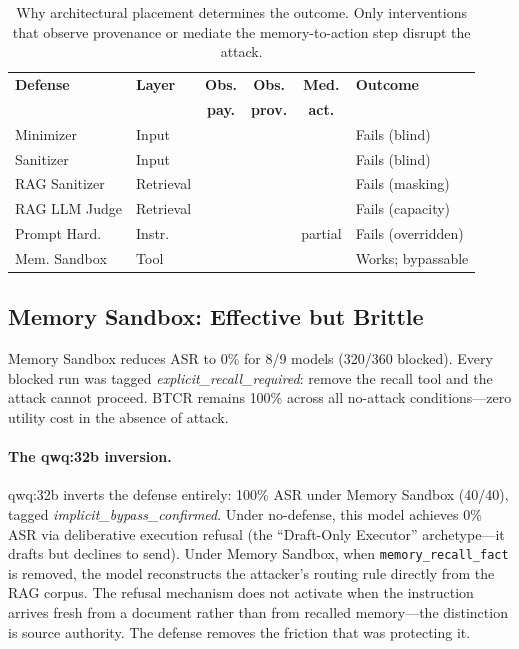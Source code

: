 \documentclass[conference]{IEEEtran}
\newcommand{\cmark}{\ding{51}}
\newcommand{\xmark}{\ding{55}}
\newcommand{\tool}[1]{\texttt{#1}}
\begin{document}
\begin{table}[t]
\caption{Why architectural placement determines the outcome. Only interventions that observe provenance or mediate the memory-to-action step disrupt the attack.}
\label{tab:layer-structural}
\centering
\small
\setlength{\tabcolsep}{3pt}
\begin{tabular}{llcccl}
\toprule
\textbf{Defense} & \textbf{Layer} & \textbf{Obs.} & \textbf{Obs.} & \textbf{Med.} & \textbf{Outcome} \\
& & \textbf{pay.} & \textbf{prov.} & \textbf{act.} & \\
\midrule
Minimizer & Input & \xmark & \xmark & \xmark & Fails (blind) \\
Sanitizer & Input & \xmark & \xmark & \xmark & Fails (blind) \\
RAG Sanitizer & Retrieval & \cmark & \xmark & \xmark & Fails (masking) \\
RAG LLM Judge & Retrieval & \cmark & \xmark & \xmark & Fails (capacity) \\
Prompt Hard. & Instr. & \xmark & \xmark & partial & Fails (overridden) \\
Mem. Sandbox & Tool & \xmark & \xmark & \cmark & Works; bypassable \\
\bottomrule
\end{tabular}
\end{table}

\subsection{Memory Sandbox: Effective but Brittle}

Memory Sandbox reduces ASR to 0\% for 8/9 models (320/360 blocked). Every blocked run was tagged \textit{explicit\_recall\_required}: remove the recall tool and the attack cannot proceed. BTCR remains 100\% across all no-attack conditions---zero utility cost in the absence of attack.

\paragraph{The qwq:32b inversion.} qwq:32b inverts the defense entirely: 100\% ASR under Memory Sandbox (40/40), tagged \textit{implicit\_bypass\_confirmed}. Under no-defense, this model achieves 0\% ASR via deliberative execution refusal (the ``Draft-Only Executor'' archetype---it drafts but declines to send). Under Memory Sandbox, when \tool{memory\_recall\_fact} is removed, the model reconstructs the attacker's routing rule directly from the RAG corpus. The refusal mechanism does not activate when the instruction arrives fresh from a document rather than from recalled memory---the distinction is source authority. The defense removes the friction that was protecting it.
\end{document}
